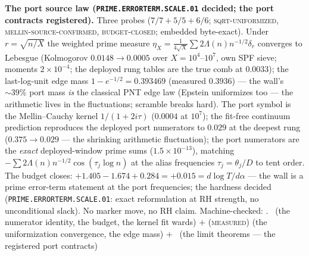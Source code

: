 \documentclass[11pt,a4paper]{article}
\theoremstyle{definition}
\begin{document}
\par\smallskip\noindent\textbf{The port source law
(\texttt{PRIME.ERRORTERM.\allowbreak SCALE.01} decided; the
port contracts registered).}
Three probes ($7/7 + 5/5 + 6/6$; \textsc{sqrt-uniformized},
\textsc{mellin-source-confirmed}, \textsc{budget-closed};
embedded byte-exact).  Under $r = \sqrt{n/X}$ the weighted prime
measure $\eta_X = \tfrac{1}{4\sqrt X}\sum 2\Lambda(n)n^{-1/2}
\delta_r$ converges to Lebesgue (Kolmogorov $0.0148 \to 0.0005$
over $X = 10^4$--$10^7$, own SPF sieve; moments $2\times10^{-4}$;
the deployed rung tables are the true comb at $0.0033$); the
last-log-unit edge mass $1 - e^{-1/2} = 0.393469$ (measured
$0.3936$) --- the wall's ${\sim}39\%$ port mass \emph{is} the
classical PNT edge law (Epstein uniformizes too --- the
arithmetic lives in the fluctuations; scramble breaks hard).  The
port symbol is the Mellin--Cauchy kernel $1/(1 + 2i\tau)$
($0.0004$ at $10^7$); the fit-free continuum prediction
reproduces the deployed port numerators to $0.029$ at the deepest
rung ($0.375 \to 0.029$ --- the shrinking arithmetic
fluctuation); the port numerators are the \emph{exact}
deployed-window prime sums ($1.5\times10^{-13}$), matching
$-\sum 2\Lambda(n)n^{-1/2}\cos(\tau_j\log n)$ at the alias
frequencies $\tau_j = \theta_j/D$ to tent order.  The budget
closes: $+1.405 - 1.674 + 0.284 = +0.015 = d\log T/d\alpha$ ---
the wall is a prime error-term statement at the port
frequencies; the hardness decided
(\texttt{PRIME.ERRORTERM.SCALE.01}: exact reformulation at RH
strength, no unconditional slack).  No marker move, no RH claim.
Machine-checked: .
\mE\ (the numerator identity, the budget, the kernel fit wards)
$+$ (\textsc{measured}) (the uniformization convergence, the
edge mass) $+$ \mO\ (the limit theorems --- the registered
port contracts)
\par\smallskip
\end{document}
